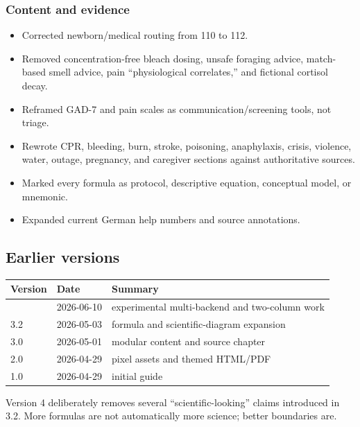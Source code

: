 \hypertarget{content-and-evidence}{%
\subsubsection{Content and evidence}\label{content-and-evidence}}

\begin{itemize}
\tightlist
\item
  Corrected newborn/medical routing from 110 to 112.
\item
  Removed concentration-free bleach dosing, unsafe foraging advice,
  match-based smell advice, pain ``physiological correlates,'' and
  fictional cortisol decay.
\item
  Reframed GAD-7 and pain scales as communication/screening tools, not
  triage.
\item
  Rewrote CPR, bleeding, burn, stroke, poisoning, anaphylaxis, crisis,
  violence, water, outage, pregnancy, and caregiver sections against
  authoritative sources.
\item
  Marked every formula as protocol, descriptive equation, conceptual
  model, or mnemonic.
\item
  Expanded current German help numbers and source annotations.
\end{itemize}

\hypertarget{earlier-versions}{%
\subsection{Earlier versions}\label{earlier-versions}}

\begin{longtable}[]{@{}lll@{}}
\toprule\noalign{}
Version & Date & Summary \\
\midrule\noalign{}
\endhead
\bottomrule\noalign{}
\endlastfoot
3.4 & 2026-06-10 & experimental multi-backend and two-column work \\
3.2 & 2026-05-03 & formula and scientific-diagram expansion \\
3.0 & 2026-05-01 & modular content and source chapter \\
2.0 & 2026-04-29 & pixel assets and themed HTML/PDF \\
1.0 & 2026-04-29 & initial guide \\
\end{longtable}

Version 4 deliberately removes several ``scientific-looking'' claims
introduced in 3.2. More formulas are not automatically more science;
better boundaries are.

